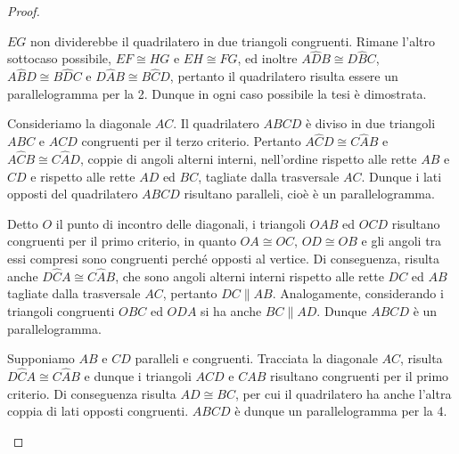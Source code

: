 \begin{proof}
\begin{enumerate*}
    \(EG\) non dividerebbe il quadrilatero in due triangoli congruenti. 
    Rimane l'altro sottocaso possibile, \(EF\cong HG\) e \(EH\cong FG\), ed 
    inoltre \(A\widehat{D}B\cong D\widehat{B}C\), \(A\widehat{B}D\cong 
    B\widehat{D}C\) e \(D\widehat{A}B\cong B\widehat{C}D\), pertanto il 
    quadrilatero risulta essere un parallelogramma per la 2. Dunque in 
    ogni caso possibile la tesi è dimostrata.
    \item Consideriamo la diagonale \(AC\). Il quadrilatero \(ABCD\) è diviso 
    in due triangoli \(ABC\) e \(ACD\) congruenti per il terzo criterio. 
    Pertanto \(A\widehat{C}D\cong C\widehat{A}B\) e \(A\widehat{C}B\cong 
    C\widehat{A}D\), coppie di angoli alterni interni, nell'ordine 
    rispetto alle rette \(AB\) e \(CD\) e rispetto alle rette \(AD\) ed \(BC\), 
    tagliate dalla trasversale \(AC\). Dunque i lati opposti del 
    quadrilatero \(ABCD\) risultano paralleli, cioè è un parallelogramma.
    \item Detto \(O\) il punto di incontro delle diagonali, i triangoli 
    \(OAB\) ed \(OCD\) risultano congruenti per il primo criterio, in quanto 
    \(OA\cong OC\), \(OD\cong OB\) e gli angoli tra essi compresi sono 
    congruenti perché opposti al vertice. Di conseguenza, risulta anche 
    \(D\widehat{C}A\cong C\widehat{A}B\), che sono angoli alterni interni 
    rispetto alle rette \(DC\) ed \(AB\) tagliate dalla trasversale \(AC\), 
    pertanto \(DC\parallel AB\). Analogamente, considerando i triangoli 
    congruenti \(OBC\) ed \(ODA\) si ha anche \(BC\parallel AD\). Dunque \(ABCD\) 
    è un parallelogramma.
    \item Supponiamo \(AB\) e \(CD\) paralleli e congruenti. Tracciata la 
    diagonale \(AC\), risulta \(D\widehat{C}A\cong C\widehat{A}B\) e dunque i 
    triangoli \(ACD\) e \(CAB\) risultano congruenti per il primo criterio. 
    Di conseguenza risulta \(AD\cong BC\), per cui il quadrilatero ha anche 
    l'altra coppia di lati opposti congruenti. \(ABCD\) è dunque un 
    parallelogramma per la 4.
  \end{enumerate*}
\end{proof}



